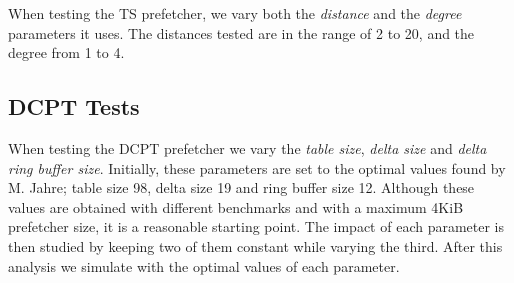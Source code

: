 When testing the TS prefetcher, we vary both the \emph{distance} and the
\emph{degree} parameters it uses. The distances tested are in the range of 2 to
20, and the degree from 1 to 4.

\subsection{DCPT Tests}

When testing the DCPT prefetcher we vary the \emph{table size}, \emph{delta
size} and \emph{delta ring buffer size}. Initially, these parameters are set to
the optimal values found by M. Jahre\cite{dcpt}; table size 98, delta size
19 and ring buffer size 12. Although these values are obtained with different benchmarks and with a
maximum 4KiB prefetcher size, it is a reasonable starting point. The impact of
each parameter is then studied by keeping two of them constant while varying the
third. After this analysis we simulate with the optimal values of each parameter.

